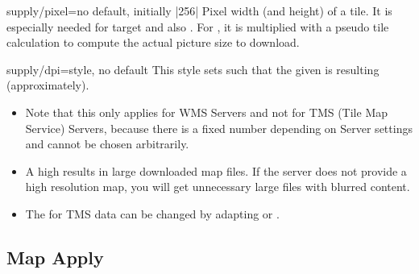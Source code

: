 \clearpage
\begin{docMrcKey}{supply/pixel}{=}{no default, initially |256|}
  Pixel width (and height) of a tile. It is especially needed for
  target  and also .
  For , it is multiplied with a pseudo tile calculation
  to compute the actual picture size to download.
\end{docMrcKey}


\begin{docMrcKey}{supply/dpi}{=}{style, no default}
  This style sets  such that the given 
  is resulting (approximately).
  \begin{itemize}
  \item Note that this only applies for WMS Servers and not for
    TMS (Tile Map Service) Servers,
    because there  is a fixed number depending on
    Server settings and cannot be chosen arbitrarily.
  \item A high  results in large downloaded map files.
    If the server does not provide a high resolution map, you will get
    unnecessary large files with blurred content.
  \item The  for TMS data can be changed by adapting
     or .
  \end{itemize}

\begin{dispExample}
\end{dispExample}

\end{docMrcKey}





\subsection{Map Apply}

